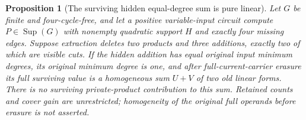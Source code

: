 \documentclass[11pt]{article}
\newcommand{\Sup}{\operatorname{Sup}}
\newtheorem{proposition}[theorem]{Proposition}
\theoremstyle{definition}
\theoremstyle{remark}
\begin{document}
\begin{proposition}[The surviving hidden equal-degree sum is pure linear]\label{prop:hiddenequalpure}
Let $G$ be finite and four-cycle-free, and let a positive variable-input circuit compute $P\in\Sup(G)$ with nonempty quadratic support $H$ and exactly four missing edges. Suppose extraction deletes two products and three additions, exactly two of which are visible cuts. If the hidden addition has equal original input minimum degrees, its original minimum degree is one, and after full-current-carrier erasure its full surviving value is a homogeneous sum $U+V$ of two old linear forms. There is no surviving private-product contribution to this sum. Retained counts and cover gain are unrestricted; homogeneity of the original full operands before erasure is not asserted.
\end{proposition}
\end{document}
